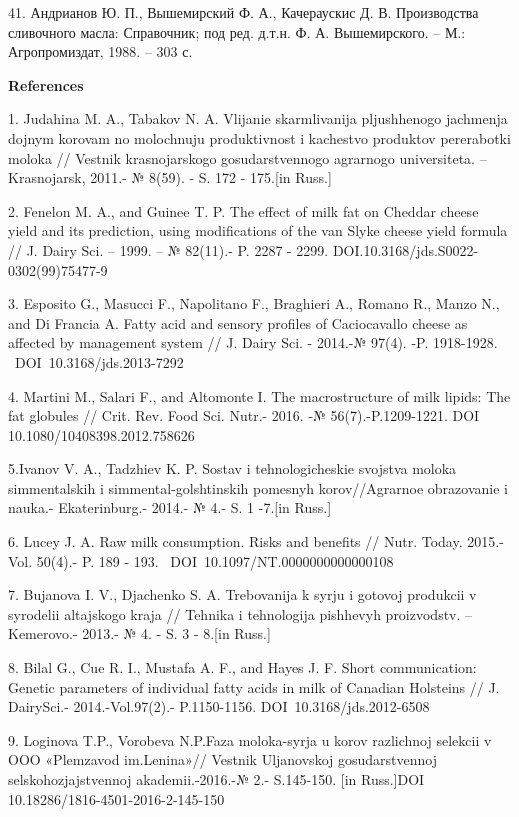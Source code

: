 41. Андрианов Ю. П., Вышемирский Ф. А., Качераускис Д. В. Производства
сливочного масла: Справочник; под ред. д.т.н. Ф. А. Вышемирского. -- М.:
Агропромиздат, 1988. -- 303 с.

{\bfseries References}

1. Judahina M. A., Tabakov N. A. Vlijanie skarmlivanija pljushhenogo
jachmenja dojnym korovam no molochnuju produktivnost\textquotesingle{} i
kachestvo produktov pererabotki moloka // Vestnik krasnojarskogo
gosudarstvennogo agrarnogo universiteta. -- Krasnojarsk, 2011.- № 8(59).
- S. 172 - 175.{[}in Russ.{]}

2. Fenelon M. A., and Guinee T. P. The effect of milk fat on Cheddar
cheese yield and its prediction, using modifications of the van Slyke
cheese yield formula // J. Dairy Sci. -- 1999. -- № 82(11).- P. 2287 -
2299. DOI.10.3168/jds.S0022-0302(99)75477-9

3. Esposito G., Masucci F., Napolitano F., Braghieri A., Romano R.,
Manzo N., and Di Francia A. Fatty acid and sensory profiles of
Caciocavallo cheese as affected by management system // J. Dairy Sci. -
2014.-№ 97(4). -P. 1918-1928. ~DOI~10.3168/jds.2013-7292

4. Martini M., Salari F., and Altomonte I. The macrostructure of milk
lipids: The fat globules // Crit. Rev. Food Sci. Nutr.- 2016. -№
56(7).-P.1209-1221. DOI 10.1080/10408398.2012.758626

5.Ivanov V. A., Tadzhiev K. P. Sostav i tehnologicheskie svojstva moloka
simmental\textquotesingle skih i simmental-golshtinskih pomesnyh
korov//Agrarnoe obrazovanie i nauka.- Ekaterinburg.- 2014.- № 4.- S. 1
-7.{[}in Russ.{]}

6. Lucey J. A. Raw milk consumption. Risks and benefits // Nutr. Today.
2015.-Vol. 50(4).- P. 189 - 193. ~DOI~10.1097/NT.0000000000000108

7. Bujanova I. V., D\textquotesingle jachenko S. A. Trebovanija k
syr\textquotesingle ju i gotovoj produkcii v syrodelii altajskogo kraja
// Tehnika i tehnologija pishhevyh proizvodstv. --Kemerovo.- 2013.- № 4.
- S. 3 - 8.{[}in Russ.{]}

8. Bilal G., Cue R. I., Mustafa A. F., and Hayes J. F. Short
communication: Genetic parameters of individual fatty acids in milk of
Canadian Holsteins // J. DairySci.- 2014.-Vol.97(2).- P.1150-1156.
DOI~10.3168/jds.2012-6508

9. Loginova T.P., Vorob\textquotesingle eva N.P.Faza
moloka-syr\textquotesingle ja u korov razlichnoj selekcii v OOO
«Plemzavod im.Lenina»// Vestnik Ul\textquotesingle janovskoj
gosudarstvennoj sel\textquotesingle skohozjajstvennoj akademii.-2016.-№
2.- S.145-150. {[}in Russ.{]}DOI 10.18286/1816-4501-2016-2-145-150

